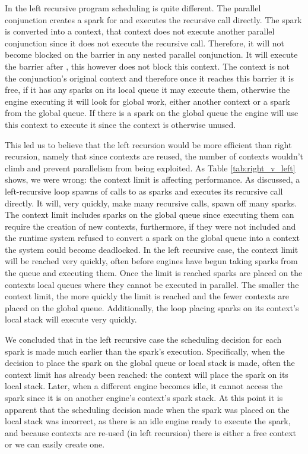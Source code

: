 In the left recursive program scheduling is quite different.
The parallel conjunction creates a spark for  and executes the
recursive call directly.
The spark is converted into a context,
that context does not execute another parallel conjunction since it does not
execute the recursive call.
Therefore, it will not become blocked on the \joinandcontinue barrier in any
nested parallel conjunction.
It will execute the barrier after ,
this however does not block this context.
The context is not the conjunction's original context and therefore once it
reaches this barrier it is free,
if it has any sparks on its local queue it may execute them,
otherwise the engine executing it will look for global work,
either another context or a spark from the global queue.
If there is a spark on the global queue the engine will use this context to
execute it since the context is otherwise unused.

This led us to believe that the left recursion would be more efficient than
right recursion,
namely that since contexts are reused, the number of contexts wouldn't climb
and prevent parallelism from being exploited.
As Table \ref{tab:right_v_left} shows, we were wrong:
the context limit is affecting performance.
As discussed, a left-recursive loop spawns of calls to  as sparks
and executes its recursive call directly.
It will, very quickly,
make many recursive calls, spawn off many sparks.
The context limit includes sparks on the global queue since
executing them can require the creation of new contexts,
furthermore, if they were not included and the runtime system refused to
convert a spark on the global queue into a context the system could become
deadlocked.
In the left recursive case,
the context limit will be reached very quickly,
often before engines have begun taking sparks from the queue and executing
them.
Once the limit is reached sparks are placed on the contexts local queues
where they cannot be executed in parallel.
The smaller the context limit,
the more quickly the limit is reached and the fewer contexts are placed on
the global queue.
Additionally,
the loop placing sparks on its context's local stack will execute very
quickly.

We concluded that
in the left recursive case
the scheduling decision for each spark is made much earlier than the spark's
execution.
Specifically,
when the decision to place the spark on the global queue or local stack is
made,
often the context limit has already been reached:
the context will place the spark on its local stack.
Later, when a different engine becomes idle,
it cannot access the spark since it is on another engine's context's spark
stack.
At this point it is apparent that the scheduling decision made when the
spark was placed on the local stack was incorrect,
as there is an idle engine ready to execute the spark,
and because contexts are re-used (in left recursion) there is either a free
context or we can easily create one.

